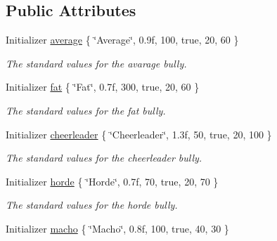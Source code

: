 \subsection*{Public Attributes}
\begin{DoxyCompactItemize}
\item 
\hypertarget{class_enemy_a04fde836189e93751a4be45bc86b3ca9}{Initializer \hyperlink{class_enemy_a04fde836189e93751a4be45bc86b3ca9}{average} \{ \char`\"{}Average\char`\"{}, 0.\+9f, 100, true, 20, 60 \}}\label{class_enemy_a04fde836189e93751a4be45bc86b3ca9}

\begin{DoxyCompactList}\small\item\em The standard values for the avarage bully. \end{DoxyCompactList}\item 
\hypertarget{class_enemy_a0654bcd2d0ddb4ac579e5430a5482a10}{Initializer \hyperlink{class_enemy_a0654bcd2d0ddb4ac579e5430a5482a10}{fat} \{ \char`\"{}Fat\char`\"{}, 0.\+7f, 300, true, 20, 60 \}}\label{class_enemy_a0654bcd2d0ddb4ac579e5430a5482a10}

\begin{DoxyCompactList}\small\item\em The standard values for the fat bully. \end{DoxyCompactList}\item 
\hypertarget{class_enemy_a16c06a75f59967cbd0533aebdcce676c}{Initializer \hyperlink{class_enemy_a16c06a75f59967cbd0533aebdcce676c}{cheerleader} \{ \char`\"{}Cheerleader\char`\"{}, 1.\+3f, 50, true, 20, 100 \}}\label{class_enemy_a16c06a75f59967cbd0533aebdcce676c}

\begin{DoxyCompactList}\small\item\em The standard values for the cheerleader bully. \end{DoxyCompactList}\item 
\hypertarget{class_enemy_a3e355f118dd67a0f091428b7f5af81dd}{Initializer \hyperlink{class_enemy_a3e355f118dd67a0f091428b7f5af81dd}{horde} \{ \char`\"{}Horde\char`\"{}, 0.\+7f, 70, true, 20, 70 \}}\label{class_enemy_a3e355f118dd67a0f091428b7f5af81dd}

\begin{DoxyCompactList}\small\item\em The standard values for the horde bully. \end{DoxyCompactList}\item 
\hypertarget{class_enemy_ab283f79ee46f2a28756b0e796090e4f3}{Initializer \hyperlink{class_enemy_ab283f79ee46f2a28756b0e796090e4f3}{macho} \{ \char`\"{}Macho\char`\"{}, 0.\+8f, 100, true, 40, 30 \}}\label{class_enemy_ab283f79ee46f2a28756b0e796090e4f3}


\end{DoxyCompactItemize}
